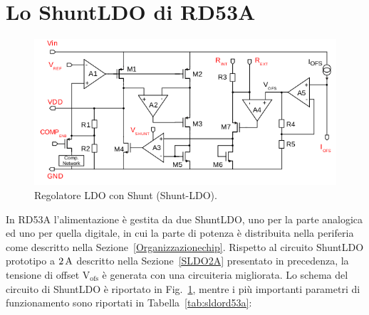 \section{Lo ShuntLDO di RD53A}
\begin{figure}
\centering
\includegraphics[width=\textwidth]{Immagini/SLDO_RD53A}
\caption{Regolatore LDO con Shunt (Shunt-LDO).}
\label{SLDO_RD53A}
\end{figure}
In RD53A l'alimentazione è gestita da due ShuntLDO, uno per la parte analogica ed uno per quella digitale, in cui la parte di potenza \`e distribuita nella periferia come descritto nella Sezione~\ref{Organizzazionechip}. Rispetto al circuito ShuntLDO prototipo a $2\rm \, A$ descritto nella Sezione~\ref{SLDO2A} presentato in precedenza, la tensione di offset $\mathrm{V_{ofs}}$ è generata con una circuiteria migliorata. Lo schema del circuito di ShuntLDO è riportato in Fig.~\ref{SLDO_RD53A}, mentre i pi\`u importanti parametri di funzionamento sono riportati in Tabella~\ref{tab:sldord53a}:

